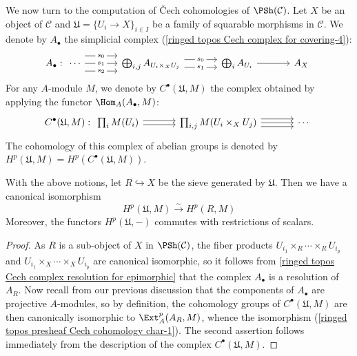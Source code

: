 We now turn to the computation of \v{C}ech cohomologies of $\PSh(\mathcal{C})$. Let $X$ be an object of $\mathcal{C}$ and $\mathfrak{U}=\{U_i\to X\}_{i\in I}$ be a family of squarable morphisms in $\mathcal{C}$. We denote by $A_\bullet$ the simplicial complex (\ref{ringed topos Cech complex for covering-4}):
\[A_\bullet:\begin{tikzcd}[column sep=12mm]
\cdots\ar[r,shift left=8pt,"s_0"description]\ar[r,"s_1"description]\ar[r,shift right=8pt,"s_2"description]
&\bigoplus_{i,j}A_{U_i\times_XU_j}\ar[r,shift left=4pt,"s_0"description]\ar[r,shift right=4pt,"s_1"description]
&\bigoplus_iA_{U_i}\ar[r]
&A_X
\end{tikzcd}\]
For any $A$-module $M$, we denote by $C^\bullet(\mathfrak{U},M)$ the complex obtained by applying the functor $\Hom_A(A_\bullet,M)$:
\[C^\bullet(\mathfrak{U},M):\begin{tikzcd}[column sep=12mm]
\prod_{i}M(U_i)\ar[r,shift left=2pt]\ar[r,shift right=2pt]
&\prod_{i,j}M(U_i\times_XU_j)\ar[r,shift left=4pt]\ar[r]\ar[r,shift right=4pt]
&\cdots
\end{tikzcd}\]
The cohomology of this complex of abelian groups is denoted by $H^p(\mathfrak{U},M)=H^p(C^\bullet(\mathfrak{U},M))$.

\begin{proposition}\label{ringed topos presheaf Cech cohomology char}
With the above notions, let $R\hookrightarrow X$ be the sieve generated by $\mathfrak{U}$. Then we have a canonical isomorphism
\begin{equation}\label{ringed topos presheaf Cech cohomology char-1}
H^p(\mathfrak{U},M) \stackrel{\sim}{\to } H^p(R,M)
\end{equation}
Moreover, the functors $H^p(\mathfrak{U},-)$ commutes with restrictions of scalars.
\end{proposition}
\begin{proof}
As $R$ is a sub-object of $X$ in $\PSh(\mathcal{C})$, the fiber products $U_{i_1}\times_R\cdots\times_RU_{i_p}$ and $U_{i_1}\times_X\cdots\times_XU_{i_p}$ are canonical isomorphic, so it follows from \cref{ringed topos Cech complex resolution for epimorphic} that the complex $A_\bullet$ is a resolution of $A_R$. Now recall from our previous discussion that the components of $A_\bullet$ are projective $A$-modules, so by definition, the cohomology groups of $C^\bullet(\mathfrak{U},M)$ are then canonically isomorphic to $\Ext_A^p(A_R,M)$, whence the isomorphism (\ref{ringed topos presheaf Cech cohomology char-1}). The second assertion follows immediately from the description of the complex $C^\bullet(\mathfrak{U},M)$.
\end{proof}

